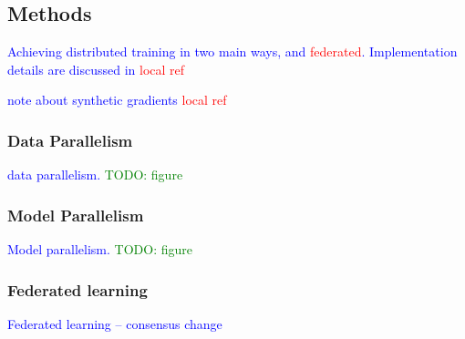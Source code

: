 \subsection{Methods}

\textcolor{blue}{Achieving distributed training in two main ways, and \textcolor{red}{federated}. Implementation details are discussed in \textcolor{red}{local ref}}

\textcolor{blue}{note about synthetic gradients \textcolor{red}{local ref}}


\subsubsection{Data Parallelism}

\textcolor{blue}{data parallelism. \textcolor{green}{TODO: figure}}

\subsubsection{Model Parallelism}

\textcolor{blue}{Model parallelism. \textcolor{green}{TODO: figure}}

\subsubsection{Federated learning}

\textcolor{blue}{Federated learning -- consensus change}

